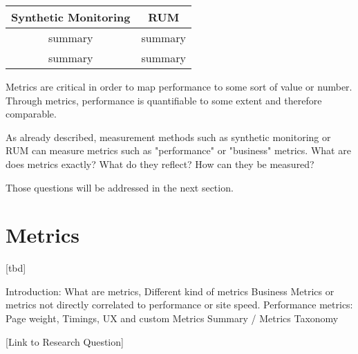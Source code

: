 \begin{center}
\begin{tabular}{  c | c  }
Synthetic Monitoring & RUM \\
\hline
summary & summary \\
\hline
summary & summary \\
\end{tabular}
\end{center}






Metrics are critical in order to map performance to some sort of value or number.
Through metrics, performance is quantifiable to some extent and therefore comparable.

As already described, measurement methods such as synthetic monitoring or RUM can measure metrics such as "performance" or "business" metrics.
What are does metrics exactly?
What do they reflect?
How can they be measured?

Those questions will be addressed in the next section.









\section{Metrics}


[tbd]


Introduction: What are metrics, Different kind of metrics
Business Metrics or metrics not directly correlated to performance or site speed.
Performance metrics: Page weight, Timings, UX and custom Metrics
Summary / Metrics Taxonomy


[Link to Research Question]






